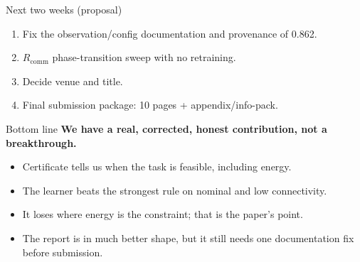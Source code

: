 \documentclass[aspectratio=169,10pt]{beamer}
\begin{document}
\begin{frame}{Next two weeks (proposal)}
  \begin{enumerate}
    \item Fix the observation/config documentation and provenance of 0.862.
    \item $R_{\mathrm{comm}}$ phase-transition sweep with no retraining.
    \item Decide venue and title.
    \item Final submission package: 10 pages + appendix/info-pack.
  \end{enumerate}
\end{frame}

\begin{frame}{Bottom line}
  \textbf{We have a real, corrected, honest contribution, not a breakthrough.}
  \begin{itemize}
    \item Certificate tells us when the task is feasible, including energy.
    \item The learner beats the strongest rule on nominal and low connectivity.
    \item It loses where energy is the constraint; that is the paper's point.
    \item The report is in much better shape, but it still needs one documentation fix before submission.
  \end{itemize}
\end{frame}
\end{document}
